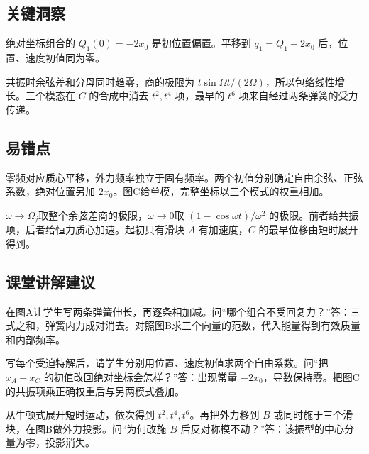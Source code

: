\documentclass[UTF8,fontset=fandol,a4paper,11pt]{ctexart}
\begin{document}


\subsection*{关键洞察}

绝对坐标组合的 $Q_1(0)=-2x_0$ 是初位置偏置。平移到 $q_1=Q_1+2x_0$ 后，位置、速度初值同为零。

共振时余弦差和分母同时趋零，商的极限为 $t\sin\Omega t/(2\Omega)$，所以包络线性增长。三个模态在 $C$ 的合成中消去 $t^2,t^4$ 项，最早的 $t^6$ 项来自经过两条弹簧的受力传递。




\subsection*{易错点}

零频对应质心平移，外力频率独立于固有频率。两个初值分别确定自由余弦、正弦系数，绝对位置另加 $2x_0$。图C给单模，完整坐标以三个模式的权重相加。

$\omega\to\Omega_j$取整个余弦差商的极限，$\omega\to0$取 $(1-\cos\omega t)/\omega^2$ 的极限。前者给共振项，后者给恒力质心加速。起初只有滑块 $A$ 有加速度，$C$ 的最早位移由短时展开得到。




\subsection*{课堂讲解建议}

在图A让学生写两条弹簧伸长，再逐条相加减。问“哪个组合不受回复力？”答：三式之和，弹簧内力成对消去。对照图B求三个向量的范数，代入能量得到有效质量和内部频率。

写每个受迫特解后，请学生分别用位置、速度初值求两个自由系数。问“把 $x_A-x_C$ 的初值改回绝对坐标会怎样？”答：出现常量 $-2x_0$，导数保持零。把图C的共振项乘正确权重后与另两模式叠加。

从牛顿式展开短时运动，依次得到 $t^2,t^4,t^6$。再把外力移到 $B$ 或同时施于三个滑块，在图B做外力投影。问“为何改施 $B$ 后反对称模不动？”答：该振型的中心分量为零，投影消失。


\end{document}
